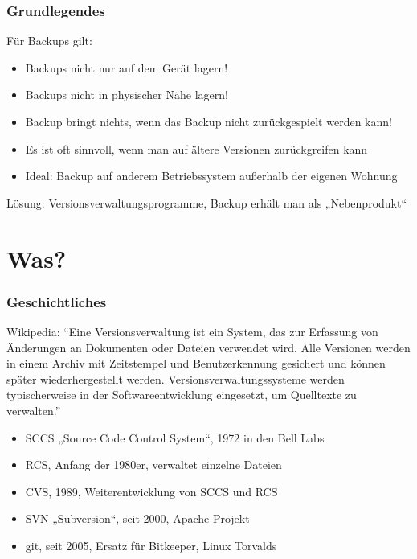 \documentclass[12pt,ngerman]{beamer}
\begin{document}
\begin{frame}
\frametitle{Grundlegendes}

Für Backups gilt:

\begin{itemize}
\item Backups nicht nur auf dem Gerät lagern!
\item Backups nicht in physischer Nähe lagern!
\item Backup bringt nichts, wenn das Backup nicht zurückgespielt werden kann!
\item Es ist oft sinnvoll, wenn man auf ältere Versionen zurückgreifen kann
\item Ideal: Backup auf anderem Betriebssystem außerhalb der
eigenen Wohnung
\end{itemize}

Lösung: Versionsverwaltungsprogramme, Backup erhält man
als „Nebenprodukt“

\end{frame}

\section{Was?}

\begin{frame}
\frametitle{Geschichtliches}

Wikipedia: \enquote{Eine Versionsverwaltung ist ein System, das zur
Erfassung von Änderungen an Dokumenten oder Dateien
verwendet wird. Alle Versionen werden in einem Archiv mit
Zeitstempel und Benutzerkennung gesichert und können später
wiederhergestellt werden. Versionsverwaltungssysteme werden
typischerweise in der Softwareentwicklung eingesetzt, um
Quelltexte zu verwalten.}

\begin{itemize}
\item SCCS „Source Code Control System“, 1972 in den Bell Labs
\item  RCS, Anfang der 1980er, verwaltet einzelne Dateien
\item  CVS, 1989, Weiterentwicklung von SCCS und RCS
\item  SVN „Subversion“, seit 2000, Apache-Projekt
\item  git, seit 2005, Ersatz für Bitkeeper, Linux Torvalds
\end{itemize}
\end{frame}
\end{document}
